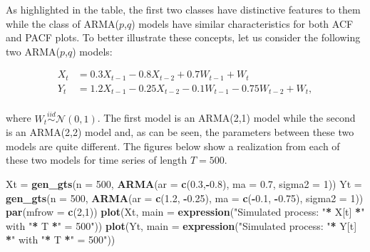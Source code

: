 \documentclass[]{book}
\newenvironment{Shaded}{\begin{snugshade}}{\end{snugshade}}
\newcommand{\KeywordTok}[1]{\textcolor[rgb]{0.13,0.29,0.53}{\textbf{#1}}}
\newcommand{\DataTypeTok}[1]{\textcolor[rgb]{0.13,0.29,0.53}{#1}}
\newcommand{\DecValTok}[1]{\textcolor[rgb]{0.00,0.00,0.81}{#1}}
\newcommand{\FloatTok}[1]{\textcolor[rgb]{0.00,0.00,0.81}{#1}}
\newcommand{\StringTok}[1]{\textcolor[rgb]{0.31,0.60,0.02}{#1}}
\newcommand{\OperatorTok}[1]{\textcolor[rgb]{0.81,0.36,0.00}{\textbf{#1}}}
\newcommand{\NormalTok}[1]{#1}
\theoremstyle{definition}
\theoremstyle{definition}
\theoremstyle{definition}
\theoremstyle{remark}
\begin{document}
As highlighted in the table, the first two classes have distinctive
features to them while the class of ARMA(\(p\),\(q\)) models have
similar characteristics for both ACF and PACF plots. To better
illustrate these concepts, let us consider the following two
ARMA(\(p\),\(q\)) models:

\[
\begin{aligned}
X_t &= 0.3 X_{t-1} - 0.8 X_{t-2} +  0.7 W_{t-1} + W_t \\
Y_t &= 1.2 X_{t-1} - 0.25 X_{t-2} - 0.1 W_{t-1} - 0.75 W_{t-2} + W_t, \\
\end{aligned}
\]

where \(W_t \overset{iid}{\sim} \mathcal{N}(0, 1)\). The first model is
an ARMA(2,1) model while the second is an ARMA(2,2) model and, as can be
seen, the parameters between these two models are quite different. The
figures below show a realization from each of these two models for time
series of length \(T=500\).

\begin{Shaded}
\begin{Highlighting}[]
\NormalTok{Xt =}\StringTok{ }\KeywordTok{gen_gts}\NormalTok{(}\DataTypeTok{n =} \DecValTok{500}\NormalTok{, }\KeywordTok{ARMA}\NormalTok{(}\DataTypeTok{ar =} \KeywordTok{c}\NormalTok{(}\FloatTok{0.3}\NormalTok{,}\OperatorTok{-}\FloatTok{0.8}\NormalTok{), }\DataTypeTok{ma =} \FloatTok{0.7}\NormalTok{, }\DataTypeTok{sigma2 =} \DecValTok{1}\NormalTok{))}
\NormalTok{Yt =}\StringTok{ }\KeywordTok{gen_gts}\NormalTok{(}\DataTypeTok{n =} \DecValTok{500}\NormalTok{, }\KeywordTok{ARMA}\NormalTok{(}\DataTypeTok{ar =} \KeywordTok{c}\NormalTok{(}\FloatTok{1.2}\NormalTok{, }\OperatorTok{-}\FloatTok{0.25}\NormalTok{), }
             \DataTypeTok{ma =} \KeywordTok{c}\NormalTok{(}\OperatorTok{-}\FloatTok{0.1}\NormalTok{, }\OperatorTok{-}\FloatTok{0.75}\NormalTok{), }\DataTypeTok{sigma2 =} \DecValTok{1}\NormalTok{))}
\KeywordTok{par}\NormalTok{(}\DataTypeTok{mfrow =} \KeywordTok{c}\NormalTok{(}\DecValTok{2}\NormalTok{,}\DecValTok{1}\NormalTok{))}
\KeywordTok{plot}\NormalTok{(Xt, }\DataTypeTok{main =} \KeywordTok{expression}\NormalTok{(}\StringTok{"Simulated process: "}\OperatorTok{*}\StringTok{ }\NormalTok{X[t] }\OperatorTok{*}\StringTok{" with "}\OperatorTok{*}\StringTok{ }\NormalTok{T }\OperatorTok{*}\StringTok{" = 500"}\NormalTok{))}
\KeywordTok{plot}\NormalTok{(Yt, }\DataTypeTok{main =} \KeywordTok{expression}\NormalTok{(}\StringTok{"Simulated process: "}\OperatorTok{*}\StringTok{ }\NormalTok{Y[t] }\OperatorTok{*}\StringTok{" with "}\OperatorTok{*}\StringTok{ }\NormalTok{T }\OperatorTok{*}\StringTok{" = 500"}\NormalTok{))}
\end{Highlighting}
\end{Shaded}
\end{document}
